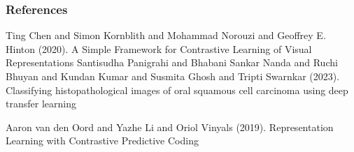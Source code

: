 \documentclass{beamer}
\begin{document}


\begin{frame}[allowframebreaks] 
\frametitle{References}
\begin{thebibliography}{1}
 Ting Chen and
                  Simon Kornblith and
                  Mohammad Norouzi and
                  Geoffrey E. Hinton (2020). A Simple Framework for Contrastive Learning of Visual Representations
\bibitem{} Santisudha Panigrahi and Bhabani Sankar Nanda and Ruchi Bhuyan and Kundan Kumar and Susmita Ghosh and Tripti Swarnkar (2023). Classifying histopathological images of oral squamous cell carcinoma using deep transfer learning

 Aaron van den Oord and Yazhe Li and Oriol Vinyals (2019). Representation Learning with Contrastive Predictive Coding  
\end{thebibliography}

\end{frame}
\end{document}
